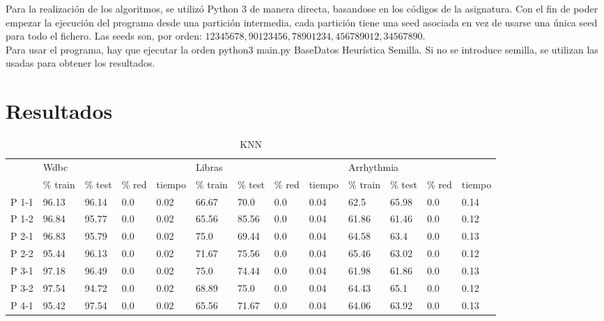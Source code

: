 Para la realización de los algoritmos, se utilizó Python 3 de manera directa, basandose en los códigos de la asignatura. Con el fin de poder empezar la ejecución del programa desde una partición intermedia, cada partición tiene una seed asociada en vez de usarse una única seed para todo el fichero. Las seeds son, por orden: $12345678,90123456,78901234,456789012,34567890$. \\

Para usar el programa, hay que ejecutar la orden  python3 main.py BaseDatos Heurística Semilla. Si no se introduce semilla, se utilizan las usadas para obtener los resultados.
\newpage
\section{Resultados}
\begin{table}[]
\centering
\caption{KNN}
\label{my-label}
\begin{tabular}{l|l|l|l|l|l|l|l|l|l|l|l|l|}
\cline{2-13}
\multirow{2}{*}{}            & \multicolumn{4}{l|}{Wdbc}            & \multicolumn{4}{l|}{Libras}          & \multicolumn{4}{l|}{Arrhythmia}      \\ \cline{2-13} 
                             & \% train & \% test & \% red & tiempo & \% train & \% test & \% red & tiempo & \% train & \% test & \% red & tiempo \\ \hline
\multicolumn{1}{|l|}{P 1-1}  & 96.13    & 96.14   & 0.0    & 0.02   & 66.67    & 70.0    & 0.0    & 0.04   & 62.5     & 65.98   & 0.0    & 0.14   \\ \hline
\multicolumn{1}{|l|}{P 1-2}  & 96.84    & 95.77   & 0.0    & 0.02   & 65.56    & 85.56   & 0.0    & 0.04   & 61.86    & 61.46   & 0.0    & 0.12   \\ \hline
\multicolumn{1}{|l|}{P 2-1}  & 96.83    & 95.79   & 0.0    & 0.02   & 75.0     & 69.44   & 0.0    & 0.04   & 64.58    & 63.4    & 0.0    & 0.13   \\ \hline
\multicolumn{1}{|l|}{P 2-2}  & 95.44    & 96.13   & 0.0    & 0.02   & 71.67    & 75.56   & 0.0    & 0.04   & 65.46    & 63.02   & 0.0    & 0.12   \\ \hline
\multicolumn{1}{|l|}{P 3-1}  & 97.18    & 96.49   & 0.0    & 0.02   & 75.0     & 74.44   & 0.0    & 0.04   & 61.98    & 61.86   & 0.0    & 0.13   \\ \hline
\multicolumn{1}{|l|}{P 3-2}  & 97.54    & 94.72   & 0.0    & 0.02   & 68.89    & 75.0    & 0.0    & 0.04   & 64.43    & 65.1    & 0.0    & 0.12   \\ \hline
\multicolumn{1}{|l|}{P 4-1}  & 95.42    & 97.54   & 0.0    & 0.02   & 65.56    & 71.67   & 0.0    & 0.04   & 64.06    & 63.92   & 0.0    & 0.13   \\ \hline

\end{tabular}
\end{table}

